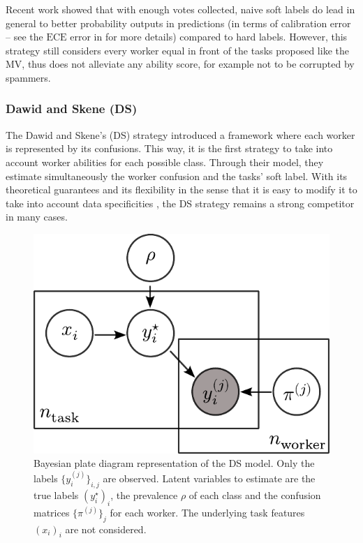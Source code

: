 Recent work \citep{collins2022eliciting} showed that with enough votes collected, naive soft labels do lead in general to better probability outputs in predictions (in terms of calibration error -- see the $\mathrm{ECE}$ error in  for more details) compared to hard labels.
However, this strategy still considers every worker equal in front of the tasks proposed like the MV, thus does not alleviate any ability score, for example not to be corrupted by spammers.

\subsubsection{Dawid and Skene (DS)}
\label{subsub:ds}

The Dawid and Skene's (DS) strategy \citep{dawid_maximum_1979} introduced a framework where each worker is represented by its confusions.
This way, it is the first strategy to take into account worker abilities for each possible class.
Through their model, they estimate simultaneously the worker confusion and the tasks' soft label.
With its theoretical guarantees \citep{gao2013minimax} and its flexibility in the sense that it is easy to modify it to take into account data specificities \citep{passonneau-carpenter-2014-benefits, servajean2017crowdsourcing,sinha2018fast}, the DS strategy remains a strong competitor in many cases.

\begin{figure}[htb]
    \centering
    \includegraphics[width=.65\textwidth]{chapters/images/bayesien_plaque_ds.pdf}
    \caption{Bayesian plate diagram representation of the DS model. Only the labels $\{y_i^{(j)}\}_{i,j}$ are observed. Latent variables to estimate are the true labels $(y_i^\star)_i$, the prevalence $\rho$ of each class and the confusion matrices $\{\pi^{(j)}\}_j$ for each worker. The underlying task features $(x_i)_i$ are not considered.}
    \label{fig:plaque_ds}
\end{figure}

